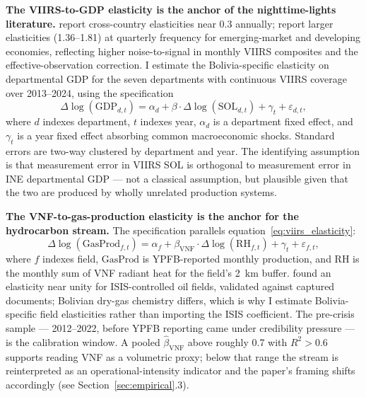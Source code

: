 \documentclass[11pt,letterpaper]{article}
\newcommand{\claim}[1]{\textbf{#1.}}
\begin{document}
\claim{The VIIRS-to-GDP elasticity is the anchor of the nighttime-lights literature} \citet{hsw2012} report cross-country elasticities near \num{0.3} annually; \citet{beyer_hu_yao2022} report larger elasticities (\numrange{1.36}{1.81}) at quarterly frequency for emerging-market and developing economies, reflecting higher noise-to-signal in monthly VIIRS composites and the effective-observation correction. I estimate the Bolivia-specific elasticity on departmental GDP for the seven departments with continuous VIIRS coverage over \numrange{2013}{2024}, using the specification
\begin{equation}
\Delta \log(\text{GDP}_{d,t}) = \alpha_d + \beta \cdot \Delta \log(\text{SOL}_{d,t}) + \gamma_t + \varepsilon_{d,t},
\label{eq:viirs_elasticity}
\end{equation}
where $d$ indexes department, $t$ indexes year, $\alpha_d$ is a department fixed effect, and $\gamma_t$ is a year fixed effect absorbing common macroeconomic shocks. Standard errors are two-way clustered by department and year. The identifying assumption is that measurement error in VIIRS SOL is orthogonal to measurement error in INE departmental GDP --- not a classical assumption, but plausible given that the two are produced by wholly unrelated production systems.

\claim{The VNF-to-gas-production elasticity is the anchor for the hydrocarbon stream} The specification parallels equation~\eqref{eq:viirs_elasticity}:
\begin{equation}
\Delta \log(\text{GasProd}_{f,t}) = \alpha_f + \beta_{\text{VNF}} \cdot \Delta \log(\text{RH}_{f,t}) + \gamma_t + \varepsilon_{f,t},
\label{eq:vnf_elasticity}
\end{equation}
where $f$ indexes field, $\text{GasProd}$ is YPFB-reported monthly production, and $\text{RH}$ is the monthly sum of VNF radiant heat for the field's \num{2}~km buffer. \citet{do_etal2018} found an elasticity near unity for ISIS-controlled oil fields, validated against captured documents; Bolivian dry-gas chemistry differs, which is why I estimate Bolivia-specific field elasticities rather than importing the ISIS coefficient. The pre-crisis sample --- \numrange{2012}{2022}, before YPFB reporting came under credibility pressure --- is the calibration window. A pooled $\hat\beta_{\text{VNF}}$ above roughly \num{0.7} with $R^2 > 0.6$ supports reading VNF as a volumetric proxy; below that range the stream is reinterpreted as an operational-intensity indicator and the paper's framing shifts accordingly (see Section~\ref{sec:empirical}.3).
\end{document}
